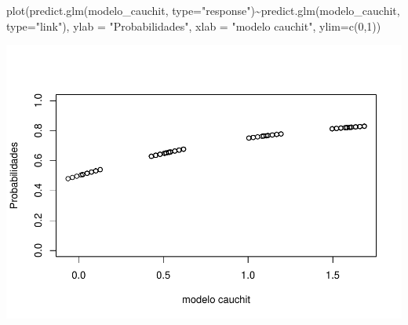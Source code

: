 \documentclass[
]{article}
\newenvironment{Shaded}{\begin{snugshade}}{\end{snugshade}}
\newcommand{\AttributeTok}[1]{\textcolor[rgb]{0.80,0.80,0.80}{#1}}
\newcommand{\DecValTok}[1]{\textcolor[rgb]{0.86,0.86,0.80}{#1}}
\newcommand{\FunctionTok}[1]{\textcolor[rgb]{0.94,0.94,0.56}{#1}}
\newcommand{\NormalTok}[1]{\textcolor[rgb]{0.80,0.80,0.80}{#1}}
\newcommand{\SpecialCharTok}[1]{\textcolor[rgb]{0.86,0.64,0.64}{#1}}
\newcommand{\StringTok}[1]{\textcolor[rgb]{0.80,0.58,0.58}{#1}}
\begin{document}
\begin{Shaded}
\begin{Highlighting}[]
\FunctionTok{plot}\NormalTok{(}\FunctionTok{predict.glm}\NormalTok{(modelo\_cauchit, }\AttributeTok{type=}\StringTok{"response"}\NormalTok{)}\SpecialCharTok{\textasciitilde{}}\FunctionTok{predict.glm}\NormalTok{(modelo\_cauchit, }\AttributeTok{type=}\StringTok{"link"}\NormalTok{),}
     \AttributeTok{ylab =} \StringTok{"Probabilidades"}\NormalTok{,}
     \AttributeTok{xlab =}  \StringTok{"modelo cauchit"}\NormalTok{,}
     \AttributeTok{ylim=}\FunctionTok{c}\NormalTok{(}\DecValTok{0}\NormalTok{,}\DecValTok{1}\NormalTok{))}
\end{Highlighting}
\end{Shaded}

\includegraphics{EDA__files/figure-latex/unnamed-chunk-12-2.pdf}
\end{document}
